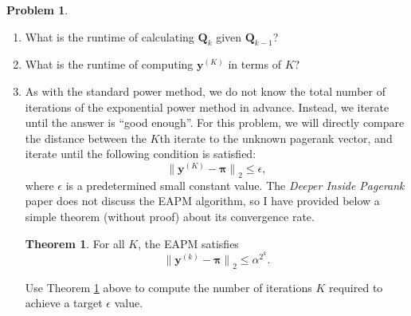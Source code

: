 \documentclass[10pt]{exam}
\theoremstyle{definition}
\newtheorem{problem}{Problem}
\newtheorem{theorem}{Theorem}
\newcommand{\Q}{\mathbf Q}
\newcommand{\pr}{\bm \pi}
\newcommand{\y}{\mathbf y}
\newcommand{\ltwo}[1]{{\lVert {#1} \rVert}_2}
\begin{document}
\begin{problem}
\begin{enumerate}
        \newpage
        \item
            What is the runtime of calculating $\Q_k$ given $\Q_{k-1}$? 
            \vspace{4in}

        \item 
            What is the runtime of computing $\y^{(K)}$ in terms of $K$?
            \vspace{3in}

        \newpage
        \item
            As with the standard power method, we do not know the total number of iterations of the exponential power method in advance.
            Instead, we iterate until the answer is ``good enough''.
            For this problem, we will directly compare the distance between the $K$th iterate to the unknown pagerank vector,
            and iterate until the following condition is satisfied:
            \begin{equation}
                \label{eq:exp:eps}
                \ltwo{\y^{(K)}-\pr} \le \epsilon,
            \end{equation}
            where $\epsilon$ is a predetermined small constant value.
            The \emph{Deeper Inside Pagerank} paper does not discuss the EAPM algorithm, so I have provided below a simple theorem (without proof) about its convergence rate.
            \begin{theorem}
                \label{thm:EAPM}
                For all $K$, the EAPM satisfies
                \begin{equation}
                    \ltwo{\y^{(k)}-\pr} \le \alpha^{2^k}.
                \end{equation}
            \end{theorem}

            Use Theorem \ref{thm:EAPM} above to compute the number of iterations $K$ required to achieve a target $\epsilon$ value.


\end{enumerate}
\end{problem}
\end{document}
